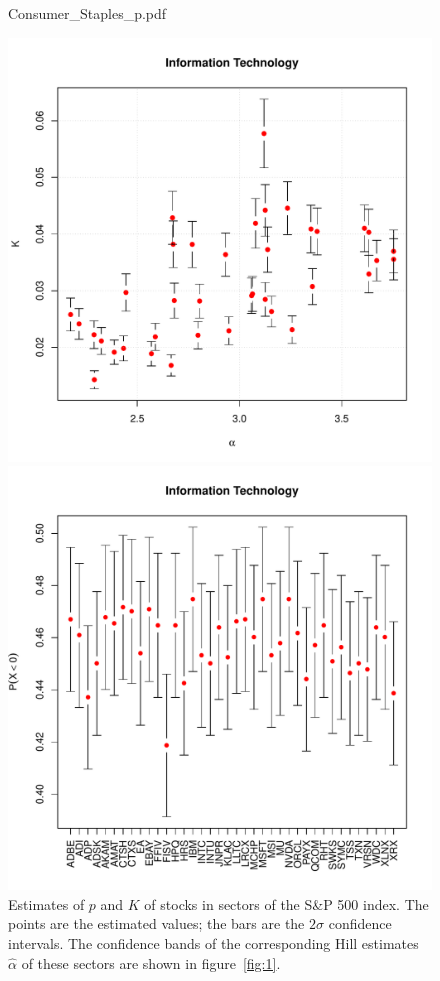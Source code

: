 \documentclass[11pt,a4]{amsart}
\newcommand{\1}{{\mathbf 1}}
\begin{document}
\begin{figure}[htb!]
\begin{minipage}{0.45\linewidth}
    {Consumer_Staples_p.pdf}
  \end{minipage}
  \begin{minipage}{0.45\linewidth}
    \includegraphics[width=\textwidth]
    {Information_Technology_alpha_K_ci.pdf}
  \end{minipage}\hfill
  \begin{minipage}{0.45\linewidth}
    \includegraphics[width=\textwidth]
    {Information_Technology_p.pdf}
  \end{minipage}
  \caption{\small Estimates of $p$ and $K$ of stocks in sectors of the
    S\&P 500 index. The points are the estimated values; the bars are
    the $2\sigma$ confidence intervals. The confidence bands of the
    corresponding Hill estimates $\hat \alpha$ of these sectors are
    shown in figure~\ref{fig:1}.
  }
  \label{fig:sectors_parameters}
\end{figure}
\end{document}
